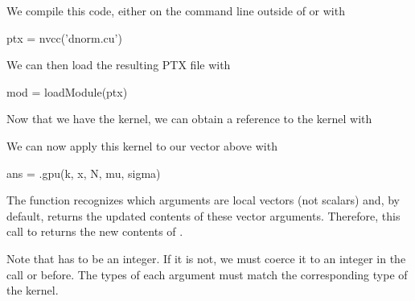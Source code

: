 We compile this code,  either on the command line outside 
of \R{} or with 
\begin{RCode}
ptx = nvcc('dnorm.cu')
\end{RCode}
We can then load the resulting PTX file with
\begin{RCode}
mod = loadModule(ptx)
\end{RCode}

Now that we have the kernel, we can obtain
a reference to the kernel with
We can now apply this kernel to our vector above with
\begin{RCode}
ans = .gpu(k, x, N, mu, sigma)
\end{RCode}
The  function recognizes which arguments
are local vectors (not scalars) and, by default, returns
the updated contents of these vector arguments.
Therefore, this call to  returns the new
contents of .


Note that  has to be an integer. If it is not, we must coerce
it to an integer in the call or before.  The types of each argument
must match the corresponding type of the kernel. 
